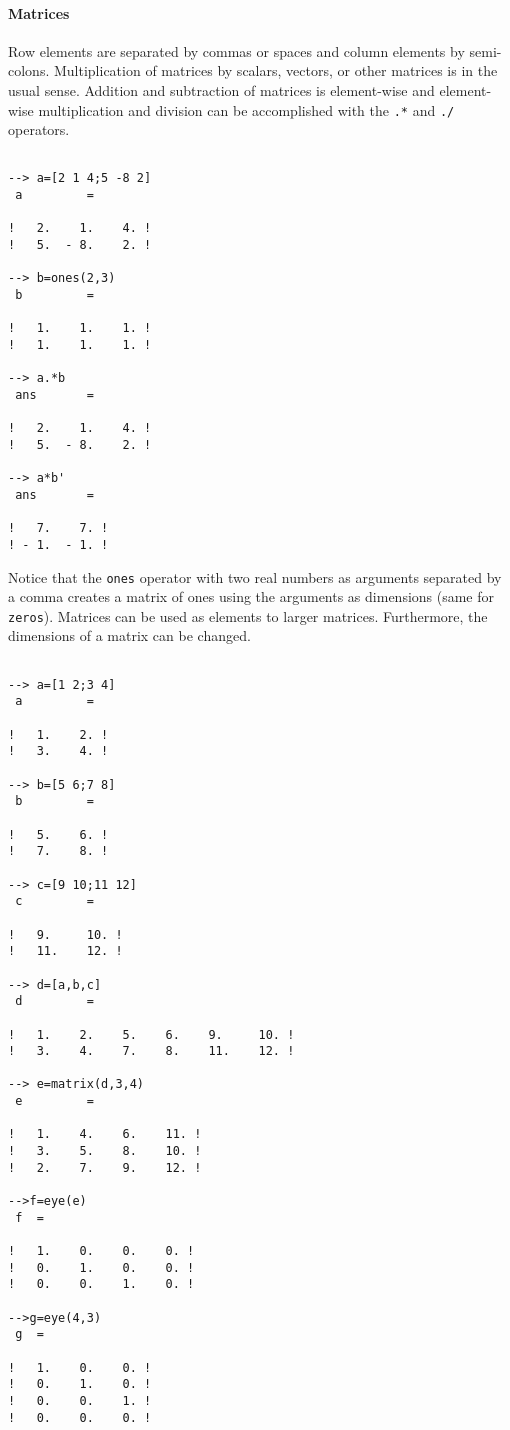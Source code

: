 \paragraph{Matrices}
Row elements are separated by commas or spaces
 and column elements by semi-colons.  Multiplication
of matrices by scalars, vectors, or other matrices is in the usual
sense.  Addition and
subtraction of matrices is element-wise and element-wise
multiplication and division can be accomplished with the {\tt .*}
and {\tt ./} operators.
\begin{verbatim}
 
--> a=[2 1 4;5 -8 2]
 a         =
 
!   2.    1.    4. !
!   5.  - 8.    2. !
 
--> b=ones(2,3)
 b         =
 
!   1.    1.    1. !
!   1.    1.    1. !
 
--> a.*b
 ans       =
 
!   2.    1.    4. !
!   5.  - 8.    2. !
 
--> a*b'
 ans       =
 
!   7.    7. !
! - 1.  - 1. !
\end{verbatim}
Notice that the {\tt ones}
operator with two real numbers as arguments separated
by a comma creates a matrix of ones using the arguments as
dimensions (same for {\tt zeros}).
Matrices can be used as elements to larger 
matrices.  Furthermore,
the dimensions of a matrix can be changed.
\begin{verbatim}
 
--> a=[1 2;3 4]
 a         =
 
!   1.    2. !
!   3.    4. !
 
--> b=[5 6;7 8]
 b         =
 
!   5.    6. !
!   7.    8. !
 
--> c=[9 10;11 12]
 c         =
 
!   9.     10. !
!   11.    12. !
 
--> d=[a,b,c]
 d         =
 
!   1.    2.    5.    6.    9.     10. !
!   3.    4.    7.    8.    11.    12. !
 
--> e=matrix(d,3,4)
 e         =
 
!   1.    4.    6.    11. !
!   3.    5.    8.    10. !
!   2.    7.    9.    12. !

-->f=eye(e)
 f  =
 
!   1.    0.    0.    0. !
!   0.    1.    0.    0. !
!   0.    0.    1.    0. !
 
-->g=eye(4,3)
 g  =
 
!   1.    0.    0. !
!   0.    1.    0. !
!   0.    0.    1. !
!   0.    0.    0. !
 
\end{verbatim}
